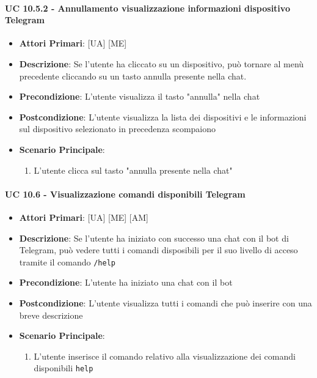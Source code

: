 			\paragraph{UC 10.5.2 - Annullamento visualizzazione informazioni dispositivo Telegram}
			\begin{itemize}
				\item \textbf{Attori Primari}: [UA] [ME]
				\item \textbf{Descrizione}: Se l'utente ha cliccato su un dispositivo, può tornare al menù precedente cliccando su un tasto annulla presente nella chat.
				\item \textbf{Precondizione}: L'utente visualizza il tasto "annulla" nella chat  
				\item \textbf{Postcondizione}: L'utente visualizza la lista dei dispositivi e le informazioni sul dispositivo selezionato in precedenza scompaiono
				\item \textbf{Scenario Principale}:
				\begin{enumerate}
					\item{L'utente clicca sul tasto "annulla presente nella chat"}
				\end{enumerate}	
			\end{itemize}

			\paragraph{UC 10.6 - Visualizzazione comandi disponibili Telegram}
			\begin{itemize}
				\item \textbf{Attori Primari}: [UA] [ME] [AM]
				\item \textbf{Descrizione}: Se l'utente ha iniziato con successo una chat con il bot di Telegram, può vedere tutti i comandi disposibili per il suo livello di acceso tramite il comando \verb!/help!
				\item \textbf{Precondizione}: L'utente ha iniziato una chat con il bot
				\item \textbf{Postcondizione}: L'utente visualizza tutti i comandi che può inserire con una breve descrizione
				\item \textbf{Scenario Principale}:
				\begin{enumerate}
					\item{L'utente inserisce il comando relativo alla visualizzazione dei comandi disponibili \verb!help!}
				\end{enumerate}	
			\end{itemize}

